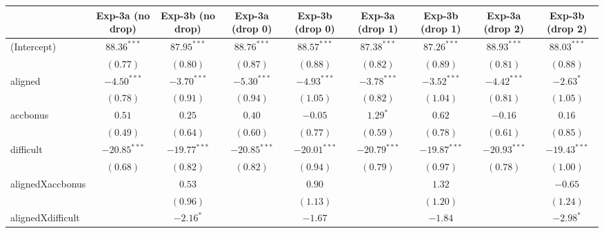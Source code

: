 
\begin{table}
\begin{center}
\begin{tabular}{l c c c c c c c c}
\hline
 & Exp-3a (no drop) & Exp-3b (no drop) & Exp-3a (drop 0) & Exp-3b (drop 0) & Exp-3a (drop 1) & Exp-3b (drop 1) & Exp-3a (drop 2) & Exp-3b (drop 2) \\
\hline
(Intercept)             & $88.36^{***}$  & $87.95^{***}$  & $88.76^{***}$  & $88.57^{***}$  & $87.38^{***}$  & $87.26^{***}$  & $88.93^{***}$  & $88.03^{***}$  \\
                        & $(0.77)$       & $(0.80)$       & $(0.87)$       & $(0.88)$       & $(0.82)$       & $(0.89)$       & $(0.81)$       & $(0.88)$       \\
aligned                 & $-4.50^{***}$  & $-3.70^{***}$  & $-5.30^{***}$  & $-4.93^{***}$  & $-3.78^{***}$  & $-3.52^{***}$  & $-4.42^{***}$  & $-2.63^{*}$    \\
                        & $(0.78)$       & $(0.91)$       & $(0.94)$       & $(1.05)$       & $(0.82)$       & $(1.04)$       & $(0.81)$       & $(1.05)$       \\
accbonus                & $0.51$         & $0.25$         & $0.40$         & $-0.05$        & $1.29^{*}$     & $0.62$         & $-0.16$        & $0.16$         \\
                        & $(0.49)$       & $(0.64)$       & $(0.60)$       & $(0.77)$       & $(0.59)$       & $(0.78)$       & $(0.61)$       & $(0.85)$       \\
difficult               & $-20.85^{***}$ & $-19.77^{***}$ & $-20.85^{***}$ & $-20.01^{***}$ & $-20.79^{***}$ & $-19.87^{***}$ & $-20.93^{***}$ & $-19.43^{***}$ \\
                        & $(0.68)$       & $(0.82)$       & $(0.82)$       & $(0.94)$       & $(0.79)$       & $(0.97)$       & $(0.78)$       & $(1.00)$       \\
alignedXaccbonus        &                & $0.53$         &                & $0.90$         &                & $1.32$         &                & $-0.65$        \\
                        &                & $(0.96)$       &                & $(1.13)$       &                & $(1.20)$       &                & $(1.24)$       \\
alignedXdifficult       &                & $-2.16^{*}$    &                & $-1.67$        &                & $-1.84$        &                & $-2.98^{*}$    \\

\end{tabular}
\end{center}
\end{table}
